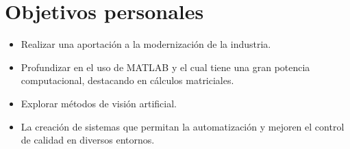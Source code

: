 \section{Objetivos personales}\label{objetivos-personales}

\begin{itemize}
    \tightlist
        \item
            Realizar una aportación a la modernización de la industria.
        \item
            Profundizar en el uso de MATLAB y el cual tiene una gran potencia computacional, destacando en cálculos matriciales.
        \item
            Explorar métodos de visión artificial.
        \item 
            La creación de sistemas que permitan la automatización y mejoren el control de calidad en diversos entornos.
\end{itemize}